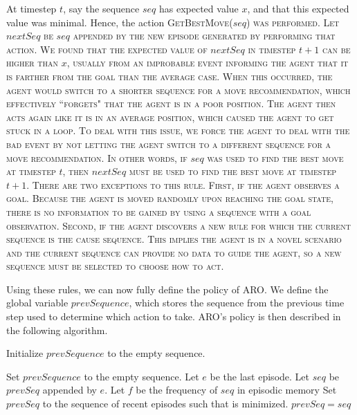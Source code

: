 \documentclass[letterpaper]{article} %
\begin{document}
At timestep $t$, say the sequence $seq$ has expected value $x$, and that this expected value was minimal. Hence, the action \scshape GetBestMove\normalfont($seq$) was performed. Let $nextSeq$ be $seq$ appended by the new episode generated by performing that action. We found that the expected value of $nextSeq$ in timestep $t+ 1$ can be higher than $x$, usually from an improbable event informing the agent that it is farther from the goal than the average case. When this occurred, the agent would switch to a shorter sequence for a move recommendation, which effectively ``forgets" that the agent is in a poor position. The agent then acts again like it is in an average position, which caused the agent to get stuck in a loop. To deal with this issue, we force the agent to deal with the bad event by not letting the agent switch to a different sequence for a move recommendation. In other words, if $seq$ was used to find  the best move at timestep $t$, then $nextSeq$ must be used to find the best move at timestep $t+1$. There are two exceptions to this rule. First, if the agent observes a goal. Because the agent is moved randomly upon reaching the goal state, there is no information to be gained by using a sequence with a goal observation. Second, if the agent discovers a new rule for which the current sequence is the cause sequence. This implies the agent is in a novel scenario and the current sequence can provide no data to guide the agent, so a new sequence must be selected to choose how to act.

Using these rules, we can now fully define the policy of ARO. We define the global variable $prevSequence$, which stores the sequence from the previous time step used to determine which action to take. ARO's policy is then described in the following algorithm.



\begin{algorithmic}
	
	\State Initialize $prevSequence$ to the empty sequence.

			\State Set $prevSequence$ to the empty sequence.
			\State \Return
		\EndIf
		\State Let $e$ be the last episode.
		\State Let $seq$ be $prevSeq$ appended by $e$.
		\State Let $f$ be the frequency of $seq$ in episodic memory
			\State Set $prevSeq$ to the sequence of recent episodes such that  is minimized.
			\State \Return {}
		\Else
			\State $prevSeq = seq$
			\State \Return {}
		\EndIf
		
	\EndFunction
	
\end{algorithmic}
\end{document}

